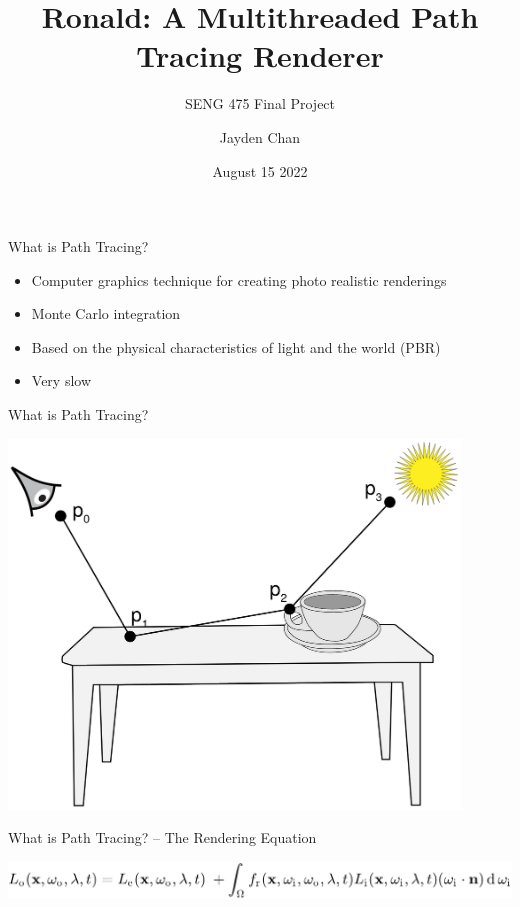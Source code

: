 \documentclass{beamer}
\title{Ronald: A Multithreaded Path Tracing Renderer}
\subtitle{SENG 475 Final Project}
\author{Jayden Chan}
\institute{\href{https://github.com/jayden-chan/ronald}{https://github.com/jayden-chan/ronald}}
\date{August 15 2022}
\begin{document}
\begin{frame}
\titlepage
\end{frame}

\begin{frame}{What is Path Tracing?}
    \begin{itemize}[<+->]
        \item Computer graphics technique for creating photo realistic renderings
        \item Monte Carlo integration
        \item Based on the physical characteristics of light and the world (PBR)
        \item Very slow
    \end{itemize}
\end{frame}

\begin{frame}{What is Path Tracing?}
    \begin{center}
        \includegraphics[width=0.9\textwidth]{./path_tracing.png}
    \end{center}
\end{frame}

\begin{frame}{What is Path Tracing? -- The Rendering Equation}
    \begin{center}
        \includegraphics[width=1.0\textwidth]{./rendering-eq.png}
    \end{center}
\end{frame}
\end{document}
